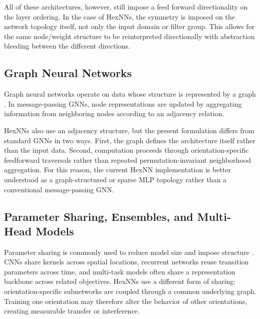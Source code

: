 All of these architectures, however, still impose a feed forward directionality on the layer ordering.
In the case of HexNNs, the symmetry is imposed on the network topology itself, not only the input domain or filter group.
This allows for the same node/weight structure to be reinterpreted directionally with abstraction bleeding between the different directions.


\subsection{Graph Neural Networks}

Graph neural networks operate on data whose structure is represented by a graph \cite{scarselli2009graph,gilmer2017neural}.
In message-passing GNNs, node representations are updated by aggregating information from neighboring nodes according to an adjacency relation.

HexNNs also use an adjacency structure, but the present formulation differs from standard GNNs in two ways.
First, the graph defines the architecture itself rather than the input data.
Second, computation proceeds through orientation-specific feedforward traversals rather than repeated permutation-invariant neighborhood aggregation.
For this reason, the current HexNN implementation is better understood as a graph-structured or sparse MLP topology rather than a conventional message-passing GNN.


\subsection{Parameter Sharing, Ensembles, and Multi-Head Models}

Parameter sharing is commonly used to reduce model size and impose structure \cite{caruana1997multitask}.
CNNs share kernels across spatial locations, recurrent networks reuse transition parameters across time, and multi-task models often share a representation backbone across related objectives.
HexNNs use a different form of sharing: orientation-specific subnetworks are coupled through a common underlying graph.
Training one orientation may therefore alter the behavior of other orientations, creating measurable transfer or interference.

